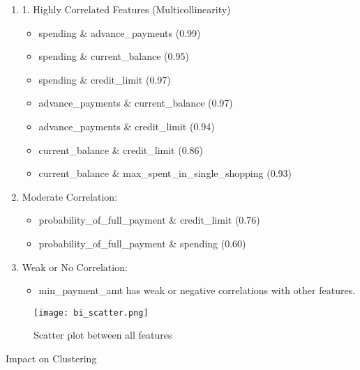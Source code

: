 \documentclass[12pt]{article}
\begin{document}
\begin{enumerate}
    \item 1. Highly Correlated Features (Multicollinearity)

    \begin{itemize}
        \item spending \& advance\_payments (0.99)
        \item spending \& current\_balance (0.95)
        \item spending \& credit\_limit (0.97)
        \item advance\_payments \& current\_balance (0.97)
        \item advance\_payments \& credit\_limit (0.94)
        \item current\_balance \& credit\_limit (0.86)
        \item current\_balance \& max\_spent\_in\_single\_shopping (0.93)
    \end{itemize}
    

    \item Moderate Correlation: 
    
    \begin{itemize}
        \item probability\_of\_full\_payment \& credit\_limit (0.76)
        
        \item probability\_of\_full\_payment \& spending (0.60)
        
    \end{itemize}

    \item Weak or No Correlation:

    \begin{itemize}
        \item min\_payment\_amt has weak or negative correlations with other features.
    \end{itemize}
\end{enumerate}

\begin{figure}[h]
    \centering
    \texttt{[image: bi\_scatter.png]}
    \caption{Scatter plot between all features}
    \label{fig:example}
\end{figure}

Impact on Clustering
\end{document}
